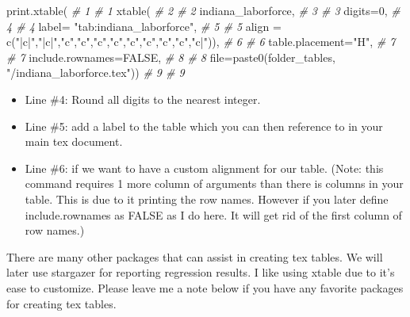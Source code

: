 \documentclass[
]{book}
\newenvironment{Shaded}{\begin{snugshade}}{\end{snugshade}}
\newcommand{\AttributeTok}[1]{\textcolor[rgb]{0.77,0.63,0.00}{#1}}
\newcommand{\CommentTok}[1]{\textcolor[rgb]{0.56,0.35,0.01}{\textit{#1}}}
\newcommand{\ConstantTok}[1]{\textcolor[rgb]{0.00,0.00,0.00}{#1}}
\newcommand{\DecValTok}[1]{\textcolor[rgb]{0.00,0.00,0.81}{#1}}
\newcommand{\FunctionTok}[1]{\textcolor[rgb]{0.00,0.00,0.00}{#1}}
\newcommand{\NormalTok}[1]{#1}
\newcommand{\StringTok}[1]{\textcolor[rgb]{0.31,0.60,0.02}{#1}}
\providecommand{\tightlist}{%
  \setlength{\itemsep}{0pt}\setlength{\parskip}{0pt}}
\begin{document}
\begin{Shaded}
\begin{Highlighting}[]
\FunctionTok{print.xtable}\NormalTok{(                                                     }\CommentTok{\# 1  \# 1}
  \FunctionTok{xtable}\NormalTok{(                                                         }\CommentTok{\# 2  \# 2}
\NormalTok{  indiana\_laborforce,                                             }\CommentTok{\# 3  \# 3}
  \AttributeTok{digits=}\DecValTok{0}\NormalTok{,                                                       }\CommentTok{\# 4  \# 4}
  \AttributeTok{label=} \StringTok{"tab:indiana\_laborforce"}\NormalTok{,                                }\CommentTok{\# 5  \# 5}
  \AttributeTok{align =} \FunctionTok{c}\NormalTok{(}\StringTok{"|c|"}\NormalTok{,}\StringTok{"|c|"}\NormalTok{,}\StringTok{"c"}\NormalTok{,}\StringTok{"c"}\NormalTok{,}\StringTok{"c"}\NormalTok{,}\StringTok{"c"}\NormalTok{,}\StringTok{"c"}\NormalTok{,}\StringTok{"c"}\NormalTok{,}\StringTok{"c"}\NormalTok{,}\StringTok{"c"}\NormalTok{,}\StringTok{"c|"}\NormalTok{)),   }\CommentTok{\# 6  \# 6}
  \AttributeTok{table.placement=}\StringTok{"H"}\NormalTok{,                                            }\CommentTok{\# 7  \# 7}
  \AttributeTok{include.rownames=}\ConstantTok{FALSE}\NormalTok{,                                         }\CommentTok{\# 8  \# 8}
  \AttributeTok{file=}\FunctionTok{paste0}\NormalTok{(folder\_tables, }\StringTok{"/indiana\_laborforce.tex"}\NormalTok{))          }\CommentTok{\# 9  \# 9}
\end{Highlighting}
\end{Shaded}

\begin{itemize}
\tightlist
\item
  Line \#4: Round all digits to the nearest integer.
\item
  Line \#5: add a label to the table which you can then reference to in your main tex document.
\item
  Line \#6: if we want to have a custom alignment for our table. (Note: this command requires 1 more column of arguments than there is columns in your table. This is due to it printing the row names. However if you later define include.rownames as FALSE as I do here. It will get rid of the first column of row names.)
\end{itemize}

There are many other packages that can assist in creating tex tables. We will later use stargazer for reporting regression results. I like using xtable due to it's ease to customize. Please leave me a note below if you have any favorite packages for creating tex tables.
\end{document}
